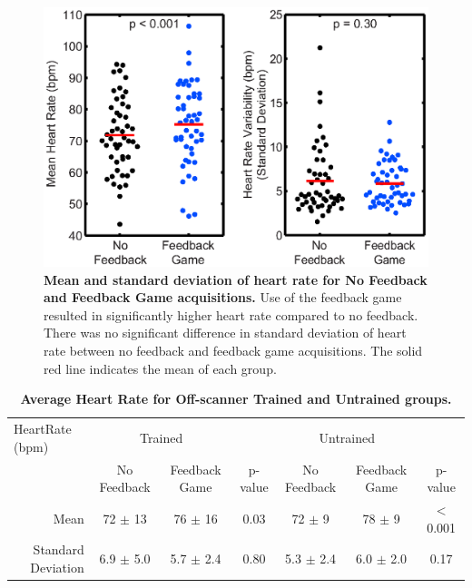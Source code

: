 	\begin{figure}
		\centering %
		\includegraphics{figures/gamepaper/06-AveHR_mean_stdDev}
		\caption[Mean and standard deviation of heart rate for No Feedback and Feedback Game acquisitions]{\textbf{Mean and standard deviation of heart rate for No Feedback and Feedback Game acquisitions.} Use of the feedback game resulted in significantly higher heart rate compared to no feedback. There was no significant difference in standard deviation of heart rate between no feedback and feedback game acquisitions. The solid red line indicates the mean of each group.}
		\label{fig:FG_heartrate}
	\end{figure}

	\begin{table}
		\centering
		\caption[Average Heart Rate for Off-scanner Trained and Untrained groups]{\textbf{Average Heart Rate for Off-scanner Trained and Untrained groups.}}
		\label{table:FG_HR}
		\begin{tabular}{ccccccc}
			\toprule
			\multicolumn{1}{l}{HeartRate (bpm)} & \multicolumn{2}{c}{Trained} & \multicolumn{1}{c}{} & \multicolumn{2}{c}{Untrained} & \multicolumn{1}{c}{}\\ 
			\multicolumn{1}{r}{} & \multicolumn{1}{c}{No Feedback} & \multicolumn{1}{c}{Feedback Game} & \multicolumn{1}{c}{p-value} & \multicolumn{1}{c}{No Feedback} & \multicolumn{1}{c}{Feedback Game} & \multicolumn{1}{c}{p-value} \\ \midrule
			\multicolumn{1}{r}{Mean} & \multicolumn{1}{c}{72 $\pm$ 13} & \multicolumn{1}{c}{76 $\pm$ 16} & \multicolumn{1}{c}{0.03} & \multicolumn{1}{c}{72 $\pm$ 9} & \multicolumn{1}{c}{78 $\pm$ 9} & \multicolumn{1}{c}{$<$ 0.001} \\
			\multicolumn{1}{r}{Standard Deviation} & \multicolumn{1}{c}{6.9 $\pm$ 5.0} & \multicolumn{1}{c}{5.7 $\pm$ 2.4} & \multicolumn{1}{c}{0.80} & \multicolumn{1}{c}{5.3 $\pm$ 2.4} & \multicolumn{1}{c}{6.0 $\pm$ 2.0} & \multicolumn{1}{c}{0.17} \\
			\bottomrule                                                 
		\end{tabular}
	\end{table}

